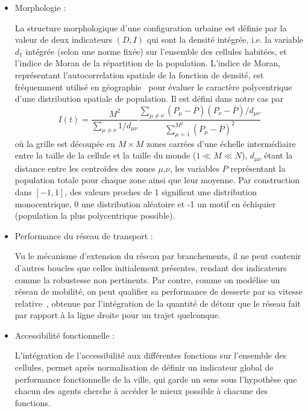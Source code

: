 \documentclass[french,12pt]{article}
\begin{document}
\begin{itemize}

\item Morphologie : 

La structure morphologique d’une configuration urbaine est définie par la valeur de deux indicateurs $(D,I)$ qui sont la densité intégrée, i.e. la variable $d_1$ intégrée (selon une norme fixée) sur l’ensemble des cellules habitées, et l’indice de Moran de la répartition de la population. L’indice de Moran, représentant l’autocorrelation spatiale de la fonction de densité, est fréquemment utilisé en géographie~\cite{tsai2005quantifying,lenechet:hal-00696445} pour évaluer le caractère polycentrique d’une distribution spatiale de population. Il est défini dans notre cas par 
%
\begin{equation}
I(t)=\frac{M^2}{\sum_{\mu\neq\nu} 1/d_{\mu\nu}}\frac{\sum_{\mu\neq\nu} (P_\mu-\overline{P})(P_\nu-\overline{P})/d_{\mu\nu}}{\sum_{\mu=1}^{M^2}(P_\mu-\overline{P})^2}
\end{equation}
%
où la grille est découpée en $M\times M$ zones carrées d’une échelle intermédiaire entre la taille de la cellule et la taille du monde ($1\ll\!M\ll\!N$), $d_{\mu\nu}$ étant la distance entre les centroïdes des zones $\mu$,$\nu$, les variables $P$ représentant la population totale pour chaque zone ainsi que leur moyenne. Par construction dans $[-1,1]$, des valeurs proches de 1 signifient une distribution monocentrique, 0 une distribution aléatoire et -1 un motif en échiquier (population la plus polycentrique possible).

\item Performance du réseau de transport :

Vu le mécanisme d’extension du réseau par branchements, il ne peut contenir d’autres boucles que celles initialement présentes, rendant des indicateurs comme la robustesse non pertinents. Par contre, comme on modélise un réseau de mobilité, on peut qualifier sa performance de desserte par sa vitesse relative~\cite{banos2012towards}, obtenue par l’intégration de la quantité de détour que le réseau fait par rapport à la ligne droite pour un trajet quelconque.

\item Accessibilité fonctionnelle : 

L’intégration de l’accessibilité aux différentes fonctions sur l’ensemble des cellules, permet après normalisation de définir un indicateur global de performance fonctionnelle de la ville, qui garde un sens sous l’hypothèse que chacun des agents cherche à accéder le mieux possible à chacune des fonctions.



\end{itemize}
\end{document}
